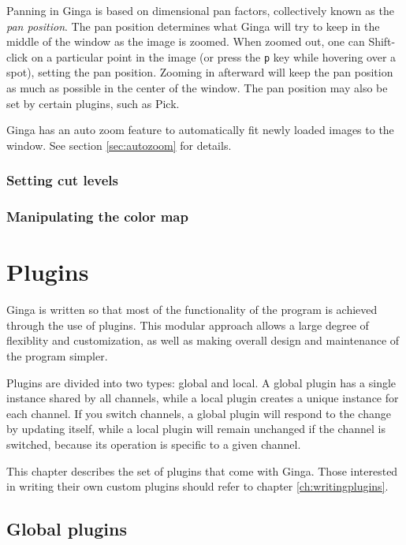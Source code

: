 \documentclass[11pt]{report}
\begin{document}
Panning in Ginga is based on dimensional pan factors, collectively known
as the \emph{pan position}.  The pan position determines what Ginga will
try to keep in the middle of the window as the image is zoomed.  
When zoomed out, one can Shift-click on a particular point in the image
(or press the {\tt p} key while hovering over a spot),
setting the pan position.  Zooming in afterward will keep the pan
position as much as possible in the center of the window.  The pan
position may also be set by certain plugins, such as Pick.

Ginga has an auto zoom feature to automatically fit newly loaded images
to the window.  See section \ref{sec:autozoom} for details.

\subsection{Setting cut levels}

\subsection{Manipulating the color map}


\chapter{Plugins}
\label{ch:plugins}
Ginga is written so that most of the functionality of the program is
achieved through the use of plugins.  This modular approach allows a
large degree of flexiblity and customization, as well as making overall
design and maintenance of the program simpler.

Plugins are divided into two types: global and local.  A global plugin
has a single instance shared by all channels, while a local plugin
creates a unique instance for each channel.  If you switch channels, a
global plugin will respond to the change by updating itself,
while a local plugin will remain unchanged if the channel is switched,
because its operation is specific to a given channel.

This chapter describes the set of plugins that come with Ginga.  Those
interested in writing their own custom plugins should refer to chapter
\ref{ch:writingplugins}. 

\section{Global plugins}
\end{document}
